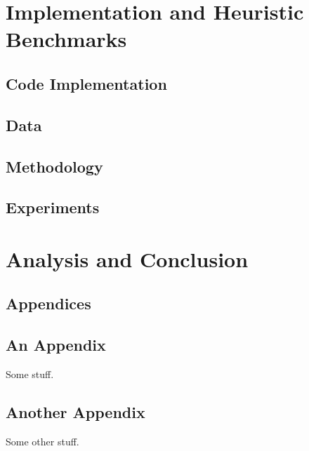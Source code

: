 \documentclass[11pt,twoside]{report}
\theoremstyle{definition}
\numberwithin{theorem}{section}
\numberwithin{definition}{section}
\numberwithin{lemma}{section}
\numberwithin{algorithm}{section}
\numberwithin{equation}{section}
\begin{document}
\chapter{Implementation and Heuristic Benchmarks}
\section{Code Implementation}
\section{Data}
\section{Methodology}
\section{Experiments}

\chapter{Analysis and Conclusion}


\clearpage

\appendix
\section*{Appendices}

\section{An Appendix}
\label{app:one}

Some stuff.
\clearpage

\section{Another Appendix}
\label{app:two}

Some other stuff.
\end{document}
